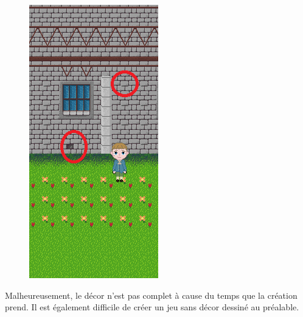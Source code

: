 \documentclass[11pt]{article}
\begin{document}
\begin{figure}[H]
\includegraphics{chateau}
\centering
\end{figure}

Malheureusement, le décor n'est pas complet à cause du temps que la création prend. Il est également difficile de créer un jeu sans décor dessiné au préalable.
\end{document}
